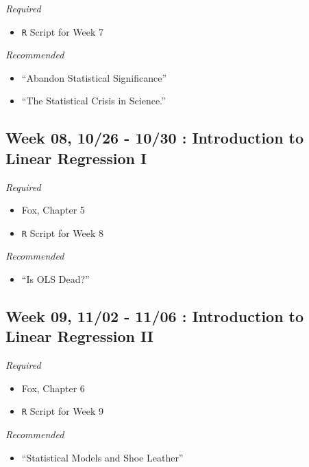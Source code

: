 \documentclass[11pt,]{article}
\providecommand{\tightlist}{%
  \setlength{\itemsep}{0pt}\setlength{\parskip}{0pt}}
\begin{document}
\emph{Required}

\begin{itemize}
\tightlist
\item
  \texttt{R} Script for Week 7
\end{itemize}

\emph{Recommended}

\begin{itemize}
\item
  ``Abandon Statistical Significance''
\item
  ``The Statistical Crisis in Science.''
\end{itemize}

\hypertarget{week-08-1026---1030-introduction-to-linear-regression-i}{%
\subsection{Week 08, 10/26 - 10/30 : Introduction to Linear Regression
I}\label{week-08-1026---1030-introduction-to-linear-regression-i}}

\emph{Required}

\begin{itemize}
\item
  Fox, Chapter 5
\item
  \texttt{R} Script for Week 8
\end{itemize}

\emph{Recommended}

\begin{itemize}
\tightlist
\item
  ``Is OLS Dead?''
\end{itemize}

\hypertarget{week-09-1102---1106-introduction-to-linear-regression-ii}{%
\subsection{Week 09, 11/02 - 11/06 : Introduction to Linear Regression
II}\label{week-09-1102---1106-introduction-to-linear-regression-ii}}

\emph{Required}

\begin{itemize}
\item
  Fox, Chapter 6
\item
  \texttt{R} Script for Week 9
\end{itemize}

\emph{Recommended}

\begin{itemize}
\tightlist
\item
  ``Statistical Models and Shoe Leather''
\end{itemize}
\end{document}
